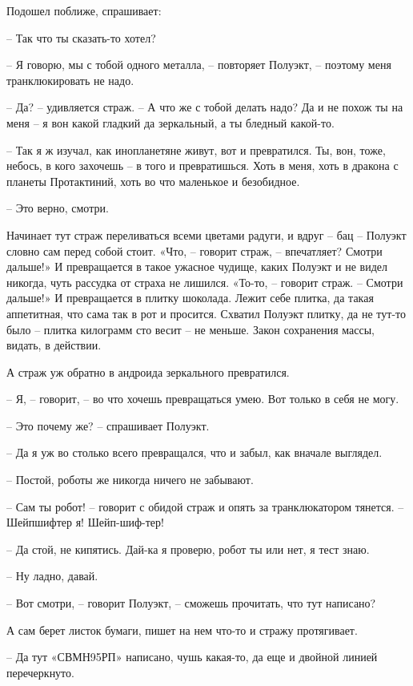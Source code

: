 \documentclass[ebook,oneside,final,openright]{memoir}
\begin{document}
Подошел поближе, спрашивает: \par
– Так что ты сказать-то хотел? \par
– Я говорю, мы с тобой одного металла, – повторяет Полуэкт, – поэтому меня транклюкировать не надо. \par
– Да? – удивляется страж. – А что же с тобой делать надо? Да и не похож ты на меня – я вон какой гладкий да зеркальный, а ты бледный какой-то. \par
– Так я ж изучал, как инопланетяне живут, вот и превратился. Ты, вон, тоже, небось, в кого захочешь – в того и превратишься. Хоть в меня, хоть в дракона с планеты Протактиний, хоть во что маленькое и безобидное. \par
– Это верно, смотри. \par
\par
Начинает тут страж переливаться всеми цветами радуги, и вдруг – бац – Полуэкт словно сам перед собой стоит. «Что, – говорит страж, – впечатляет? Смотри дальше!» И превращается в такое ужасное чудище, каких Полуэкт и не видел никогда, чуть рассудка от страха не лишился. «То-то, – говорит страж. – Смотри дальше!» И превращается в плитку шоколада. Лежит себе плитка, да такая аппетитная, что сама так в рот и просится. Схватил Полуэкт плитку, да не тут-то было – плитка килограмм сто весит – не меньше. Закон сохранения массы, видать, в действии. \par
\par
А страж уж обратно в андроида зеркального превратился. \par
– Я, – говорит, – во что хочешь превращаться умею. Вот только в себя не могу. \par
– Это почему же? – спрашивает Полуэкт.\par
– Да я уж во столько всего превращался, что и забыл, как вначале выглядел. \par
– Постой, роботы же никогда ничего не забывают. \par
– Сам ты робот! – говорит с обидой страж и опять за транклюкатором тянется. – Шейпшифтер я! Шейп-шиф-тер! \par
– Да стой, не кипятись. Дай-ка я проверю, робот ты или нет, я тест знаю. \par
– Ну ладно, давай. \par
– Вот смотри, – говорит Полуэкт, – сможешь прочитать, что тут написано? \par
А сам берет листок бумаги, пишет на нем что-то и стражу протягивает. \par
– Да тут «СВМН95РП» написано, чушь какая-то, да еще и двойной линией перечеркнуто.\par
\end{document}
